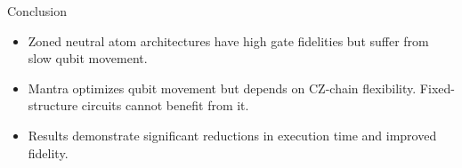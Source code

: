 \documentclass{beamer}
\begin{document}
	
	\begin{frame}{Conclusion}
		\begin{itemize}
			\item Zoned neutral atom architectures have high gate fidelities but suffer from slow qubit movement.
			\item Mantra optimizes qubit movement but depends on CZ-chain flexibility. Fixed-structure circuits cannot benefit from it.
			\item Results demonstrate significant reductions in execution time and improved fidelity.
		\end{itemize}
	\end{frame}
\end{document}
